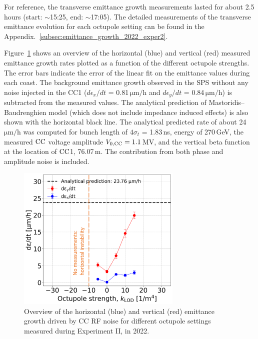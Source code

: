 For reference, the transverse emittance growth measurements lasted for about 2.5\,hours (start: $\sim$15:25, end: $\sim$17:05). The detailed measurements of the transverse emittance evolution for each octupole setting can be found in the Appendix.~\ref{subsec:emittance_growth_2022_exper2}. 

Figure~\ref{fig:H_V_emit_growth_background_subtracted_octupole_scan} shows an overview of the horizontal (blue) and vertical (red) measured emittance growth rates plotted as a function of the different octupole strengths. The error bars indicate the error of the linear fit on the emittance values during each coast. The background emittance growth observed in the SPS without any noise injected in the CC1 ($d\epsilon_x/dt$ = 0.81\,$\mathrm{\mu m/h}$ and $d\epsilon_y/dt$ = 0.84\,$\mathrm{\mu m/h}$) is subtracted from the measured values. The analytical prediction of Mastoridis--Baudrenghien model (which does not include impedance induced effects) is also shown with the horizontal black line. The analytical predicted rate of about 24\,$\mathrm{\mu m/h}$ was computed for bunch length of $4 \sigma_t$ = 1.83\,ns, energy of 270\,GeV, the measured ${\mathrm{CC}}$ voltage amplitude ${V_\mathrm{0, CC}}=1.1$\,MV, and the vertical beta function at the location of ${\mathrm{CC}}$1, 76.07\,m. The contribution from both phase and amplitude noise is included. 

\begin{figure}[!h]
   \centering         
   \includegraphics[width=0.7\textwidth]{images/Ch8/emit_H_and_V_octupole_scan_background_growth_subtracted_modified.png}
       \caption{Overview of the horizontal (blue) and vertical (red) emittance growth driven by CC RF noise for different octupole settings measured during Experiment II, in 2022.}
       \label{fig:H_V_emit_growth_background_subtracted_octupole_scan}
\end{figure}


